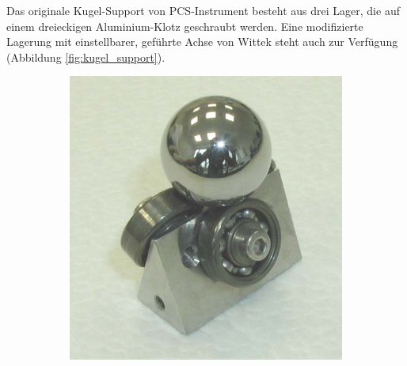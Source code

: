 Das originale Kugel-Support von PCS-Instrument besteht aus drei Lager, die auf einem dreieckigen Aluminium-Klotz geschraubt werden.
Eine modifizierte Lagerung mit einstellbarer, geführte Achse von Wittek \cite{wittek_2007} steht auch zur Verfügung (Abbildung \ref{fig:kugel_support}).
\begin{figure}[htb]
    \centering

    \begin{subfigure}[b]{0.3\textwidth}
        \includegraphics[width=\textwidth]{./images/kugel-support_original.png}
    \end{subfigure}
    \begin{subfigure}[b]{0.3\textwidth}

\end{subfigure}
\end{figure}
